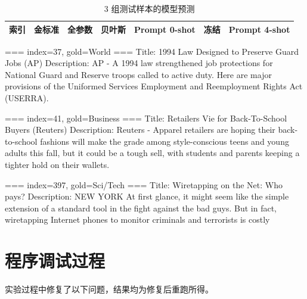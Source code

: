 \documentclass[UTF8,a4paper,zihao=-4,fontset=none]{ctexart}
\begin{document}
\begin{table}[htbp]
\centering\small
\caption{3 组测试样本的模型预测}\label{tab:samples}
\begin{tabular}{clccccc}
\toprule
索引 & 金标准 & 全参数 & 贝叶斯 & Prompt 0-shot & 冻结 & Prompt 4-shot \\
\midrule

\end{tabular}
\end{table}

\newpage
\begin{CodeBlock}
=== index=37, gold=World ===
Title: 1994 Law Designed to Preserve Guard Jobs (AP)
Description: AP - A 1994 law strengthened job protections for National Guard
and Reserve troops called to active duty. Here are major provisions of the
Uniformed Services Employment and Reemployment Rights Act (USERRA).

=== index=41, gold=Business ===
Title: Retailers Vie for Back-To-School Buyers (Reuters)
Description: Reuters - Apparel retailers are hoping their back-to-school
fashions will make the grade among style-conscious teens and young adults
this fall, but it could be a tough sell, with students and parents keeping a
tighter hold on their wallets.

=== index=397, gold=Sci/Tech ===
Title: Wiretapping on the Net: Who pays?
Description: NEW YORK At first glance, it might seem like the simple extension
of a standard tool in the fight against the bad guys. But in fact,
wiretapping Internet phones to monitor criminals and terrorists is costly
\end{CodeBlock}

\section{程序调试过程}

实验过程中修复了以下问题，结果均为修复后重跑所得。
\end{document}
